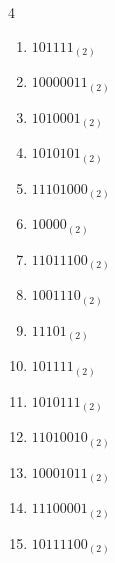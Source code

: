 \begin{multicols}{4}
\begin{enumerate}
        \phantom{$=147$}

  \item $101111_{(2)}$

        \phantom{$=47$}

\columnbreak %

  \item $10000011_{(2)}$

        \phantom{$=131$}

  \item $1010001_{(2)}$

        \phantom{$=81$}

  \item $1010101_{(2)}$

        \phantom{$=85$}

  \item $11101000_{(2)}$

        \phantom{$=232$}

  \item $10000_{(2)}$

        \phantom{$=16$}

  \item $11011100_{(2)}$

        \phantom{$=220$}

  \item $1001110_{(2)}$

        \phantom{$=78$}

  \item $11101_{(2)}$

        \phantom{$=29$}

  \item $101111_{(2)}$

        \phantom{$=47$}

  \item $1010111_{(2)}$

        \phantom{$=87$}

  \item $11010010_{(2)}$

        \phantom{$=210$}

  \item $10001011_{(2)}$

        \phantom{$=139$}

  \item $11100001_{(2)}$

        \phantom{$=225$}

  \item $10111100_{(2)}$


\end{enumerate}
\end{multicols}
